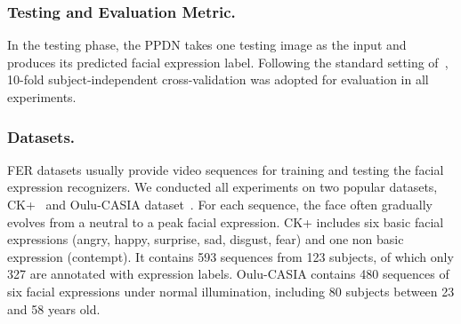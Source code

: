 \documentclass[runningheads]{llncs}
\begin{document}
\subsubsection{Testing and Evaluation Metric.}

In the testing phase, the PPDN takes one testing image as the input 
and produces its predicted facial expression label. Following the 
standard setting of~\cite{zhong2012learning,shan2009facial}, 10-fold 
subject-independent cross-validation was adopted for evaluation in all 
experiments. %

\subsubsection{Datasets.} FER datasets usually provide video sequences for 
training and testing the facial expression recognizers. We conducted all 
experiments on two popular datasets, CK+~\cite{lucey2010extended} and  
Oulu-CASIA dataset~\cite{zhao2011facial}. For each sequence, the face 
often gradually evolves from a neutral to a peak facial expression. 
CK+ includes six basic facial expressions (angry, happy, surprise, sad, 
disgust, fear) and one non basic expression (contempt).  It contains 
593 sequences from 123 subjects, of which only 327 are annotated with 
expression labels. Oulu-CASIA contains 480 sequences of six facial 
expressions under normal illumination, including 80 subjects between 23 
and 58 years old. 
\end{document}
